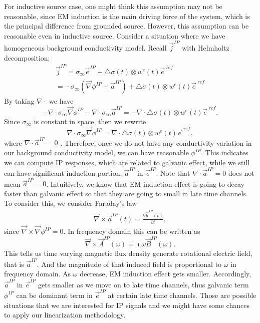 \documentclass[a4paper, 11pt]{article}
\renewcommand{\div}{\nabla\cdot}
\newcommand{\grad}{\vec \nabla}
\newcommand{\curl}{{\vec \nabla}\times}
\newcommand{\siginf}{\sigma_\infty}
\newcommand{\dsig}{\triangle\sigma}
\newcommand{\B}{\vec{B}}
\renewcommand {\j}  { {\vec j} }
\renewcommand {\b}  { {\vec b} }
\newcommand {\e}  { {\vec e} }
\begin{document}
For inductive source case, one might think this assumption may not be reasonable, since EM induction is the main driving force of the system, which is the principal difference from grounded source. However, this assumption can be reasonable even in inductive source. Consider a situation where we have homogeneous background conductivity model. Recall $\j^{IP}$ with Helmholtz decomposition:
\begin{eqnarray*}
    \j^{IP} = \siginf\e^{IP} + \dsig(t)\otimes w^{e}(t)\e^{\ ref} \\
            = -\siginf(\grad\phi^{IP}+\vec{a}^{IP}) + \dsig(t)\otimes w^{e}(t)\e^{\ ref}
\end{eqnarray*}
By taking $\div$ we have
\begin{equation*}
    -\div\siginf\grad\phi^{IP}-\div\siginf\vec{a}^{IP} = -\div\dsig(t)\otimes w^{e}(t)\e^{\ ref}.
\end{equation*}
Since $\siginf$ is constant in space, then we rewrite
\begin{equation*}
    \div\siginf\grad\phi^{IP} = \div\dsig(t)\otimes w^{e}(t)\e^{\ ref},
\end{equation*}
where $\div\vec{a}^{IP}=0$ . Therefore, once we do not have any conductivity variation in our background conductivity model, we can have reasonable $\phi^{IP}$. This indicates we can compute IP responses, which are related to galvanic effect, while we still can have significant induction portion, $\vec{a}^{IP}$ in $\e^{IP}$. Note that $\div\vec{a}^{IP}=0$ does not mean $\vec{a}^{IP}=0$. Intuitively, we know that EM induction effect is going to decay faster than galvanic effect so that they are going to small in late time channels. To consider this, we consider Faraday's law
\begin{eqnarray*}
    \curl \vec{a}^{IP}(t) = \frac{\partial \b^{IP}(t)}{\partial t},
\end{eqnarray*}
since $\curl \grad \phi^{IP} = 0$. In frequency domain this can be written as
\begin{equation*}
    \curl \vec{A}^{IP}(\omega) = \imath\omega\B^{IP}(\omega).
\end{equation*}
This tells us time varying magnetic flux density generate rotational electric field, that is $\vec{a}^{IP}$. And the magnitude of that induced field is proportional to $\omega$ in frequency domain. As $\omega$ decrease, EM induction effect gets smaller. Accordingly, $\vec{a}^{IP}$ in $\e^{IP}$ gets smaller as we move on to late time channels, thus galvanic term $\phi^{IP}$ can be dominant term in $\e^{IP}$ at certain late time channels. Those are possible situations that we are interested for IP signals and we might have some chances to apply our linearization methodology.
\end{document}
